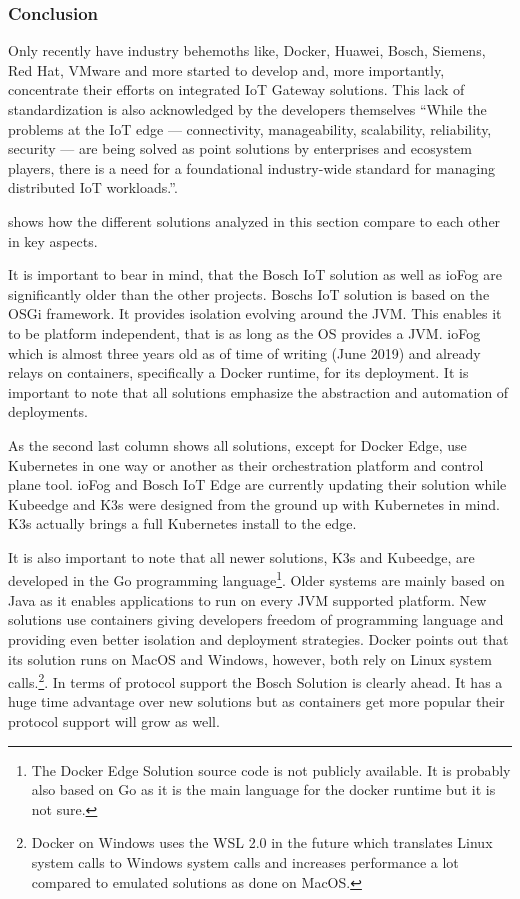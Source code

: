 \subsubsection{Conclusion}
Only recently have industry behemoths like, Docker, Huawei, Bosch, Siemens, Red Hat, VMware and more\cite{K8sattheEdgeContectOnWorkingGroup:online} started to develop and, more importantly, concentrate their efforts on integrated IoT Gateway solutions. This lack of standardization is also acknowledged by the developers themselves ``While the problems at the IoT edge — connectivity, manageability, scalability, reliability, security — are being solved as point solutions by enterprises and ecosystem players, there is a need for a foundational industry-wide standard for managing distributed IoT workloads.''\cite{ioFogK8sBlog:online}.

 shows how the different solutions analyzed in this section compare to each other in key aspects.


It is important to bear in mind, that the Bosch IoT solution as well as ioFog are significantly older than the other projects. Boschs IoT solution is based on the OSGi framework. It provides isolation evolving around the JVM. This enables it to be platform independent, that is as long as the OS provides a JVM. ioFog which is almost three years old as of time of writing (June 2019) and already relays on containers, specifically a Docker runtime, for its deployment. It is important to note that all solutions emphasize the abstraction and automation of deployments.

As the second last column shows all solutions, except for Docker Edge, use Kubernetes in one way or another as their orchestration platform and control plane tool. ioFog and Bosch IoT Edge are currently updating their solution while Kubeedge and K3s were designed from the ground up with Kubernetes in mind. K3s actually brings a full Kubernetes install to the edge.

It is also important to note that all newer solutions, K3s and Kubeedge, are developed in the Go programming language\footnote{The Docker Edge Solution source code is not publicly available. It is probably also based on Go as it is the main language for the docker runtime but it is not sure.}. Older systems are mainly based on Java as it enables applications to run on every JVM supported platform. New solutions use containers giving developers freedom of programming language and providing even better isolation and deployment strategies. Docker points out that its solution runs on MacOS and Windows, however, both rely on Linux system calls.\footnote{Docker on Windows uses the WSL 2.0 in the future which translates Linux system calls to Windows system calls and increases performance a lot compared to emulated solutions as done on MacOS.}. In terms of protocol support the Bosch Solution is clearly ahead. It has a huge time advantage over new solutions but as containers get more popular their protocol support will grow as well.



